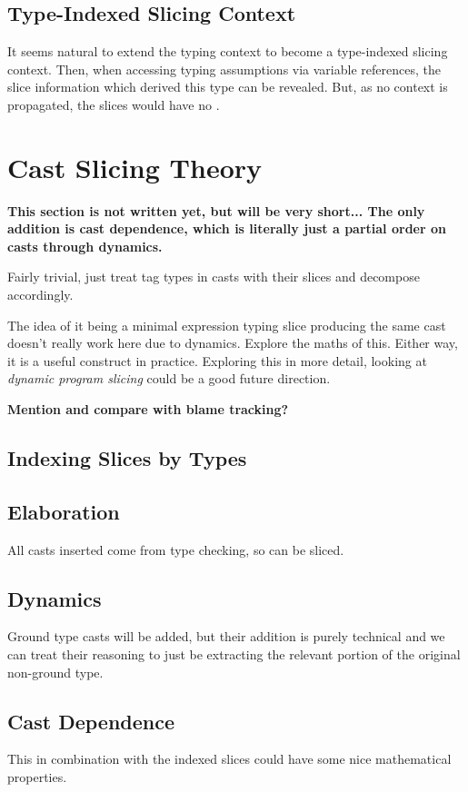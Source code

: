 \subsection{Type-Indexed Slicing Context}
\label{sec:TypeSliceContext}
It seems natural to extend the typing context to become a type-indexed slicing context. Then, when accessing typing assumptions via variable references, the slice information which derived this type can be revealed. But, as no context is propagated, the slices would have no .

\section{Cast Slicing Theory}\label{sec:CastSlicingTheory}
\textbf{This section is not written yet, but will be very short... The only addition is cast dependence, which is literally just a partial order on casts through dynamics.}

Fairly trivial, just treat tag types in casts with their slices and decompose accordingly.

The idea of it being a minimal expression typing slice producing the same cast doesn't really work here due to dynamics. Explore the maths of this. Either way, it is a useful construct in practice. Exploring this in more detail, looking at \textit{dynamic program slicing} could be a good future direction.

\textbf{Mention and compare with blame tracking?}

\subsection{Indexing Slices by Types}


\subsection{Elaboration}
All casts inserted come from type checking, so can be sliced.

\subsection{Dynamics}
Ground type casts will be added, but their addition is purely technical and we can treat their reasoning to just be extracting the relevant portion of the original non-ground type.

\subsection{Cast Dependence}
\label{sec:CastDependence}
This in combination with the indexed slices could have some nice mathematical properties.

